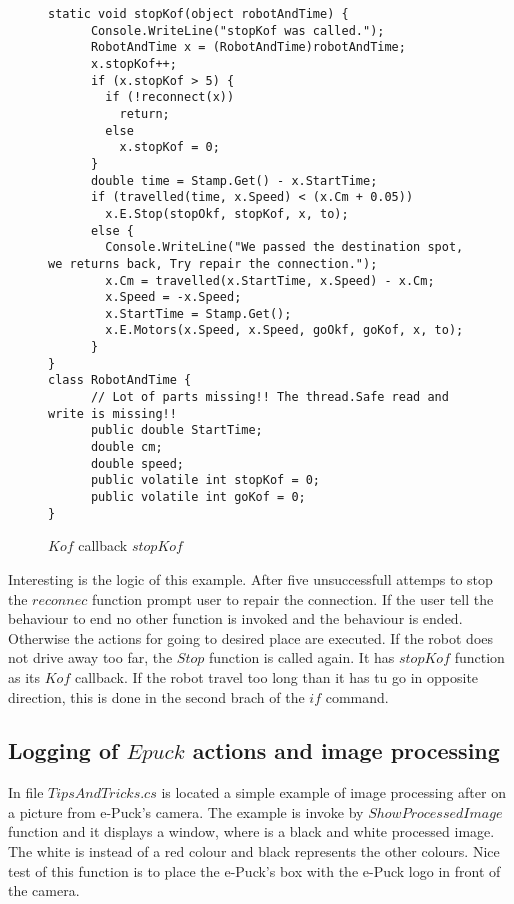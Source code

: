 \begin{figure}[!hbp]
\begin{lstlisting}
static void stopKof(object robotAndTime) {
      Console.WriteLine("stopKof was called.");
      RobotAndTime x = (RobotAndTime)robotAndTime;
      x.stopKof++;
      if (x.stopKof > 5) {
        if (!reconnect(x))
          return;
        else
          x.stopKof = 0;
      }
      double time = Stamp.Get() - x.StartTime;
      if (travelled(time, x.Speed) < (x.Cm + 0.05))
        x.E.Stop(stopOkf, stopKof, x, to);
      else {
        Console.WriteLine("We passed the destination spot, we returns back, Try repair the connection.");
        x.Cm = travelled(x.StartTime, x.Speed) - x.Cm;
        x.Speed = -x.Speed;
        x.StartTime = Stamp.Get();
        x.E.Motors(x.Speed, x.Speed, goOkf, goKof, x, to);
      }
}
class RobotAndTime {
      // Lot of parts missing!! The thread.Safe read and write is missing!!
      public double StartTime;
      double cm;
      double speed;
      public volatile int stopKof = 0;
      public volatile int goKof = 0;
}

\end{lstlisting}
\caption{$Kof$ callback $stopKof$} \label{stopKof}
\end{figure}
	Interesting is the logic of this example. After five unsuccessfull attemps to stop the $reconnec$ function
	prompt user to repair the connection. If the user tell the behaviour to end no other function is invoked and the behaviour is ended.
	Otherwise the actions for going to desired place are executed.
	If the robot does not drive away too far, the $Stop$ function is called again.
	It has $stopKof$ function as its $Kof$ callback.
	If the robot travel too long than it has tu go in opposite direction, this is done in the second brach of the $if$ command.


\subsection{Logging of $Epuck$ actions and image processing}\label{sec:logging}
	In file $TipsAndTricks.cs$ is located a simple example of image processing after on a picture from e-Puck's camera.
	The example is invoke by $ShowProcessedImage$ function and it displays a window, where is a black and white processed image.
	The white is instead of a red colour and black represents the other colours. Nice test of this function is to place
	the e-Puck's box with the e-Puck logo in front of the camera. 


